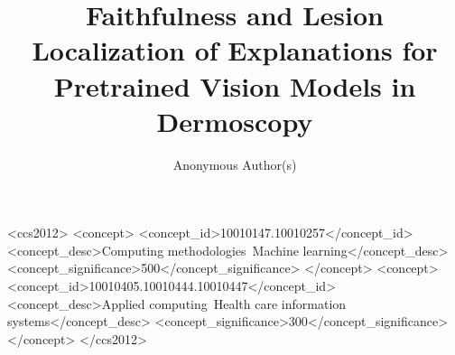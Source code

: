 \documentclass[sigconf,review,anonymous]{acmart}
\begin{document}
\title{Faithfulness and Lesion Localization of Explanations for Pretrained Vision Models in Dermoscopy}

\author{Anonymous Author(s)}



\begin{CCSXML}
<ccs2012>
<concept>
<concept_id>10010147.10010257</concept_id>
<concept_desc>Computing methodologies~Machine learning</concept_desc>
<concept_significance>500</concept_significance>
</concept>
<concept>
<concept_id>10010405.10010444.10010447</concept_id>
<concept_desc>Applied computing~Health care information systems</concept_desc>
<concept_significance>300</concept_significance>
</concept>
</ccs2012>
\end{CCSXML}


\maketitle













\end{document}

